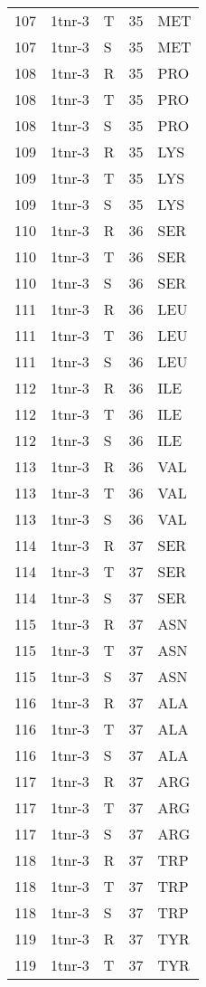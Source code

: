 \begin{longtable}[l]{l|l|l|l|l}
	107 & 1tnr-3 & T & 35 & MET \\
	107 & 1tnr-3 & S & 35 & MET \\
	108 & 1tnr-3 & R & 35 & PRO \\
	108 & 1tnr-3 & T & 35 & PRO \\
	108 & 1tnr-3 & S & 35 & PRO \\
	109 & 1tnr-3 & R & 35 & LYS \\
	109 & 1tnr-3 & T & 35 & LYS \\
	109 & 1tnr-3 & S & 35 & LYS \\
	110 & 1tnr-3 & R & 36 & SER \\
	110 & 1tnr-3 & T & 36 & SER \\
	110 & 1tnr-3 & S & 36 & SER \\
	111 & 1tnr-3 & R & 36 & LEU \\
	111 & 1tnr-3 & T & 36 & LEU \\
	111 & 1tnr-3 & S & 36 & LEU \\
	112 & 1tnr-3 & R & 36 & ILE \\
	112 & 1tnr-3 & T & 36 & ILE \\
	112 & 1tnr-3 & S & 36 & ILE \\
	113 & 1tnr-3 & R & 36 & VAL \\
	113 & 1tnr-3 & T & 36 & VAL \\
	113 & 1tnr-3 & S & 36 & VAL \\
	114 & 1tnr-3 & R & 37 & SER \\
	114 & 1tnr-3 & T & 37 & SER \\
	114 & 1tnr-3 & S & 37 & SER \\
	115 & 1tnr-3 & R & 37 & ASN \\
	115 & 1tnr-3 & T & 37 & ASN \\
	115 & 1tnr-3 & S & 37 & ASN \\
	116 & 1tnr-3 & R & 37 & ALA \\
	116 & 1tnr-3 & T & 37 & ALA \\
	116 & 1tnr-3 & S & 37 & ALA \\
	117 & 1tnr-3 & R & 37 & ARG \\
	117 & 1tnr-3 & T & 37 & ARG \\
	117 & 1tnr-3 & S & 37 & ARG \\
	118 & 1tnr-3 & R & 37 & TRP \\
	118 & 1tnr-3 & T & 37 & TRP \\
	118 & 1tnr-3 & S & 37 & TRP \\
	119 & 1tnr-3 & R & 37 & TYR \\
	119 & 1tnr-3 & T & 37 & TYR \\

\end{longtable}
